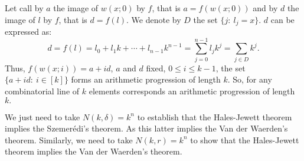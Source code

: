 Let call by $a$ the image of $w(x;0)$ by $f$, that is $a=f(w(x;0))$ and by $d$ the image of $l$ by $f$, that is $d=f(l).$ We denote by $D$ the set $\{j: \ l_j=x\}.$ $d$ can be expressed as:
$$d=f(l)=l_0+l_1k+\cdots+l_{n-1}k^{n-1}=\sum_{j=0}^{n-1}l_jk^j= \sum_{j\in D} k^j.$$
Thus, $f(w(x;i))=a+id$, $a$ and $d$ fixed, $0\leq i \leq k-1$, the set $\{a+id: \ i\in [k]\}$ forms an arithmetic progression of length $k.$ So, for any combinatorial line of $k$ elements corresponds an arithmetic progression of length $k.$

We just need to take $N(k,\delta)=k^n$ to establish that the Hales-Jewett theorem implies the Szemerédi's theorem.
As this latter implies the Van der Waerden's theorem. Similarly, we need to take $N(k,r)=k^n$ to show that the Hales-Jewett theorem implies the Van der Waerden's theorem.


























